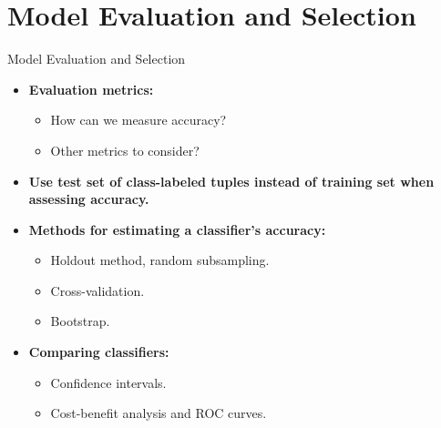 \section{Model Evaluation and Selection}\label{class:evaluation}

\begin{frame}{Model Evaluation and Selection}
	\begin{itemize}
		\item \textbf{Evaluation metrics:}
		      \begin{itemize}
			      \item How can we measure accuracy?
			      \item Other metrics to consider?
		      \end{itemize}
		\item \textbf{Use {\color{airforceblue}test} set of class-labeled tuples instead of training set when assessing accuracy.}
		\item \textbf{Methods for estimating a classifier's accuracy:}
		      \begin{itemize}
			      \item Holdout method, random subsampling.
			      \item Cross-validation.
			      \item Bootstrap.
		      \end{itemize}
		\item \textbf{Comparing classifiers:}
		      \begin{itemize}
			      \item Confidence intervals.
			      \item Cost-benefit analysis and ROC curves.
		      \end{itemize}
	\end{itemize}
\end{frame}

